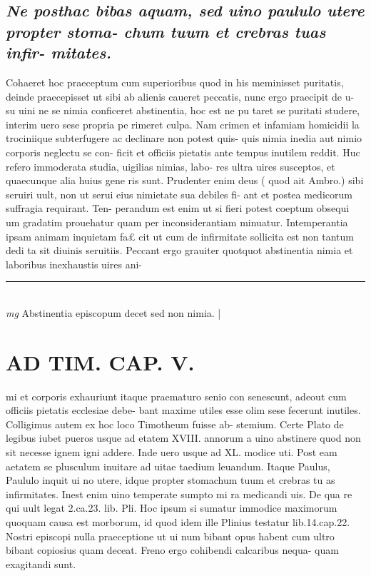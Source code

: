 \documentclass{article}
\begin{document}
\begin{pages}
\subsection*{\textit{Ne posthac bibas aquam, sed uino paululo utere propter stoma- chum tuum et crebras tuas infir- mitates. }}\pstart Cohaeret hoc praeceptum cum superioribus quod in his meminisset puritatis, deinde praecepisset ut sibi ab alienis caueret peccatis, nunc ergo praecipit de u- su uini ne se nimia conficeret abstinentia, hoc est ne pu taret se puritati studere, interim uero sese propria pe rimeret culpa. Nam crimen et infamiam homicidii la trociniique subterfugere ac declinare non potest quis- quis nimia inedia aut nimio corporis neglectu se con- ficit et officiis pietatis ante tempus inutilem reddit. Huc refero immoderata studia, uigilias nimias, labo- res ultra uires susceptos, et quaecunque alia huius gene ris sunt. Prudenter enim deus ( quod ait Ambro.) sibi seruiri uult, non ut serui eius nimietate sua debiles fi- ant et postea medicorum suffragia requirant. Ten- perandum est enim ut si fieri potest coeptum obsequi um gradatim prouehatur quam per inconsiderantiam minuatur. Intemperantia ipsam animam inquietam fa£ cit ut cum de infirmitate sollicita est non tantum dedi ta sit diuinis seruitiis. Peccant ergo grauiter quotquot abstinentia nimia et laboribus inexhaustis uires ani-  \pend
\vspace{0.5cm}\noindent
\vspace{0.2cm}\rule{1cm}{0.2pt}\\ 
\hspace{0.2cm}\textit{mg}
\footnotesize Abstinentia episcopum decet sed non nimia. 
\normalsize| 
\section*{AD TIM. CAP. V. }
\marginpar{[ p.161 ]}\pstart mi et corporis exhauriunt itaque praematuro senio con senescunt, adeout cum officiis pietatis ecclesiae debe- bant maxime utiles esse olim sese fecerunt inutiles. Colligimus autem ex hoc loco Timotheum fuisse ab- stemium. Certe Plato de legibus iubet pueros usque ad etatem XVIII. annorum a uino abstinere quod non sit necesse ignem igni addere. Inde uero usque ad XL. modice uti. Post eam aetatem se plusculum inuitare ad uitae taedium leuandum. Itaque Paulus, Paululo inquit ui no utere, idque propter stomachum tuum et crebras tu as infirmitates. Inest enim uino temperate sumpto mi ra medicandi uis. De qua re qui uult legat 2.ca.23. lib.  Pli. Hoc ipsum si sumatur immodice maximorum quoquam causa est morborum, id quod idem ille Plinius testatur lib.14.cap.22. Nostri episcopi nulla praeceptione ut ui num bibant opus habent cum ultro bibant copiosius quam deceat. Freno ergo cohibendi calcaribus nequa- quam exagitandi sunt.  \pend
{}
{}

\end{pages}
\end{document}
